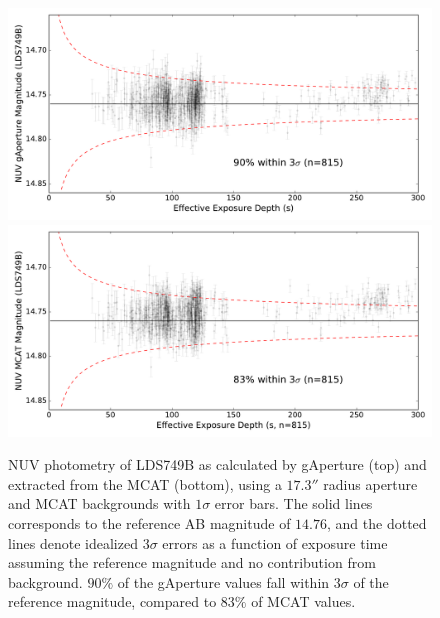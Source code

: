 \documentclass[preprint]{aastex}
\begin{document}
\begin{figure}[t!]
\includegraphics[scale=0.6]{Fig06a.pdf}\\
\includegraphics[scale=0.6]{Fig06b.pdf}
\caption{NUV photometry of LDS749B as calculated by gAperture (top) and extracted from the MCAT (bottom), using a $17.3''$ radius aperture and MCAT backgrounds with $1\sigma$ error bars. The solid lines corresponds to the reference AB magnitude of $14.76$, and the dotted lines denote idealized $3\sigma$ errors as a function of exposure time assuming the reference magnitude and no contribution from background. $90\%$ of the gAperture values fall within $3\sigma$ of the reference magnitude, compared to $83\%$ of MCAT values.
\label{ldsabsphotnuv}}
\end{figure}
\clearpage
\end{document}
